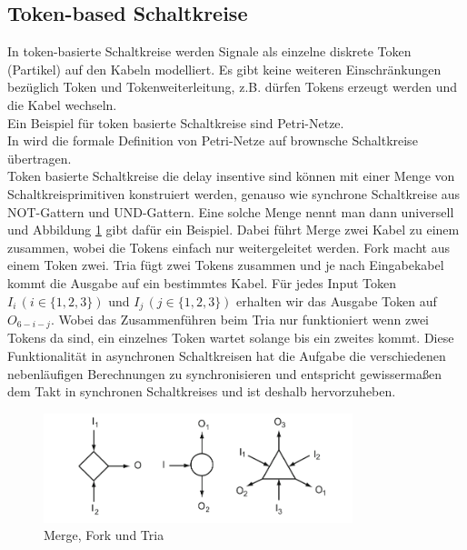 \documentclass[11pt,a4paper]{article}
\begin{document}

\subsection{Token-based Schaltkreise}
In token-basierte Schaltkreise werden Signale als einzelne diskrete
Token (Partikel) auf den Kabeln modelliert.
%
Es gibt keine weiteren Einschränkungen bezüglich Token und Tokenweiterleitung,
z.B. dürfen Tokens erzeugt werden und die Kabel wechseln. \\
%
Ein Beispiel für token basierte Schaltkreise sind Petri-Netze. \\
%
In \cite{Peper_Fundamentals_2013} wird die formale Definition von Petri-Netze
auf brownsche Schaltkreise übertragen. \\
%
Token basierte Schaltkreise die delay insentive sind können mit 
einer Menge von Schaltkreisprimitiven konstruiert werden, genauso 
wie synchrone Schaltkreise aus NOT-Gattern und UND-Gattern.
%
Eine solche Menge nennt man dann universell und Abbildung \ref{fig:tokenBased}
gibt dafür ein Beispiel.
%
Dabei führt Merge zwei Kabel zu einem zusammen, wobei die Tokens einfach 
nur weitergeleitet werden.
% 
Fork macht aus einem Token zwei.
%
Tria fügt zwei Tokens zusammen und je nach Eingabekabel kommt
die Ausgabe auf ein bestimmtes Kabel.
%
Für jedes Input Token  $ I_{i} \, (i \in \{1, 2, 3\}) $ und $ I_{j} \, (j \in 
\{1, 2, 3\}) $ erhalten wir das Ausgabe Token auf $O_{6-i-j}$.
%
Wobei das Zusammenführen beim Tria nur funktioniert wenn zwei Tokens da sind,
ein einzelnes Token wartet solange bis ein zweites kommt.
%
Diese Funktionalität in asynchronen Schaltkreisen hat die Aufgabe die 
verschiedenen nebenläufigen Berechnungen zu synchronisieren und entspricht
gewissermaßen dem Takt in synchronen Schaltkreises
und ist deshalb hervorzuheben.
%

\begin{figure}[h]
       \centering
       \includegraphics[width=9cm]{bilder/tokenBased.png}
       \caption{Merge, Fork und Tria}
       \label{fig:tokenBased}
\end{figure}    
\end{document}
